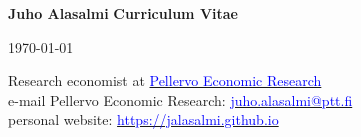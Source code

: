 \documentclass[16pt]{article}
\begin{document}
\noindent \textbf{Juho Alasalmi} \hfill{\textbf{Curriculum Vitae}} \par
\noindent  \hfill{\today} \par

\noindent Research economist at \href{http://www.ptt.fi/}{\textcolor{blue}{Pellervo Economic Research}} \\

\noindent e-mail Pellervo Economic Research: \href{mailto: juho.alasalmi@ptt.fi}{\textcolor{blue}{juho.alasalmi@ptt.fi}}\\
\noindent personal website: \href{https://jalasalmi.github.io}{\textcolor{blue}{https://jalasalmi.github.io}}

%







%
\end{document}
